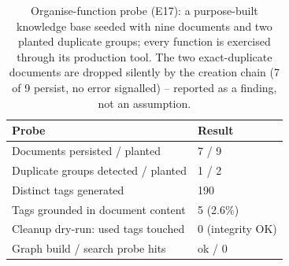 \begin{table}[t]
\centering
\footnotesize
\setlength{\tabcolsep}{3.6pt}
\caption{Organise-function probe (E17): a purpose-built knowledge base seeded
with nine documents and two planted duplicate groups; every function is
exercised through its production tool. The two exact-duplicate documents are
dropped silently by the creation chain (7 of 9 persist, no error signalled) --
reported as a finding, not an assumption.}
\label{tab:ops}
\begin{tabular}{@{}ll@{}}
\toprule
Probe & Result \\
\midrule
Documents persisted / planted & 7 / 9 \\
Duplicate groups detected / planted & 1 / 2 \\
Distinct tags generated & 190 \\
Tags grounded in document content & 5 (2.6\%) \\
Cleanup dry-run: used tags touched & 0 (integrity OK) \\
Graph build / search probe hits & ok / 0 \\
\bottomrule
\end{tabular}
\end{table}
